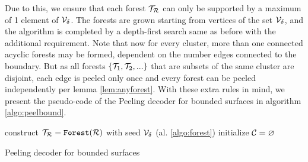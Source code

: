 Due to this, we ensure that each forest $\mathcal{T}_{\mathcal{R}}$ can only be supported by a maximum of 1 element of $\mathcal{V}_\delta$. The forests are grown starting from vertices of the set $\mathcal{V}_\delta$, and the algorithm is completed by a depth-first search same as before with the additional requirement. Note that now for every cluster, more than one connected acyclic forests may be formed, dependent on the number edges connected to the boundary. But as all forests $\{\mathcal{T}_1, \mathcal{T}_2,...\}$ that are subsets of the same cluster are disjoint, each edge is peeled only once and every forest can be peeled independently per lemma \ref{lem:anyforest}. With these extra rules in mind, we present the pseudo-code of the Peeling decoder for bounded surfaces in algorithm \ref{algo:peelbound}.

\begin{algorithm}[h]
  \BlankLine
  \BlankLine
  construct $\mathcal{T}_{\mathcal{R}} = \texttt{Forest}(\mathcal{R})$ with seed $\mathcal{V}_\delta$ (al. \ref{algo:forest})\;
  initialize $\mathcal{C} = {\varnothing}$\;
  \BlankLine
  \caption{Peeling decoder for bounded surfaces \cite{delfosse2017linear}}\label{algo:peelbound}
\end{algorithm}






